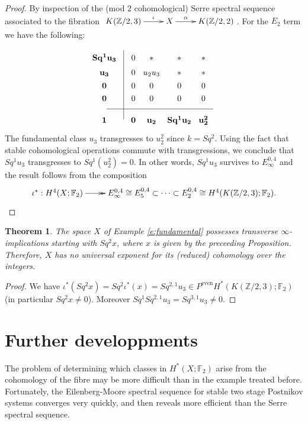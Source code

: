 \documentclass[11pt,a4paper]{amsart}
\theoremstyle{plain}
\newtheorem{thm}{Theorem}[section]
\theoremstyle{definition}
\theoremstyle{remark}
\newcommand{\Z}{\mathbb{Z}}
\newcommand{\F}{\mathbb{F}}
\begin{document}
\begin{proof}
By inspection of the (mod $2$ cohomological) Serre spectral sequence associated to the fibration $\xymatrix{K(\Z/2,3)\ar[r]^-\iota &X\ar[r]^-\alpha &K(\Z/2,2)}$. For the $E_2$ term we have the following:
$$\xymatrix@R=0.1cm@C=0.1cm{
&&\\
{\bf Sq^1u_3}  &&0 &{*} &{*} &{*}\\
{\bf u_3}  &&0 &u_2u_3&{*} &{*}\\
{\bf 0} &&0 &0 &0 &0\\
{\bf 0} &&0 &0 &0 &0\\ \ar@{-}[rrrrrr] &&&&&&\\
{\bf 1} &\ar@{-}[uuuuuu] &{\bf 0} &{\bf u_2} &{\bf Sq^1u_2} &{\bf u_2^2}
}$$
The fundamental class $u_3$ transgresses to $u_2^2$ since $k=Sq^2$. Using the fact that stable cohomological operations commute with transgressions, we conclude that $Sq^1u_3$ transgresses to $Sq^1(u_2^2)=0$. In other words, $Sq^1u_3$ survives to $E_\infty^{0,4}$ and the result follows from the composition
$$\xymatrix{
\iota^*:H^4(X;\F_2)\ar@{->>}[r] &E_\infty^{0,4}\cong E_5^{0,4}\subset\dots\subset E_2^{0,4}\cong H^4(K(\Z/2,3);\F_2).
}$$
\end{proof}

\begin{thm}
The space $X$ of Example \ref{e:fundamental} possesses transverse $\infty$-implications starting with $Sq^2 x$, where $x$ is given by the preceeding Proposition. Therefore, $X$ has no universal exponent for its (reduced) cohomology over the integers.
\end{thm}

\begin{proof}
We have $\iota^*(Sq^2 x)=Sq^2\iota^*(x)=Sq^{2,1}u_3\in P^\text{even}H^*(K(\Z/2,3);\F_2)$ (in particular $Sq^2x\not=0$). Moreover $Sq^1Sq^{2,1}u_3=Sq^{3,1}u_3\not=0$.
\end{proof}

\section{Further developpments}
\label{s:developpments}

The problem of determining which classes in $H^*(X;\F_2)$ arise from the cohomology of the fibre may be more difficult than in the example treated before. Fortunately, the Eilenberg-Moore spectral sequence for stable two stage Postnikov systems converges very quickly, and then reveals more efficient than the Serre spectral sequence.
\end{document}
